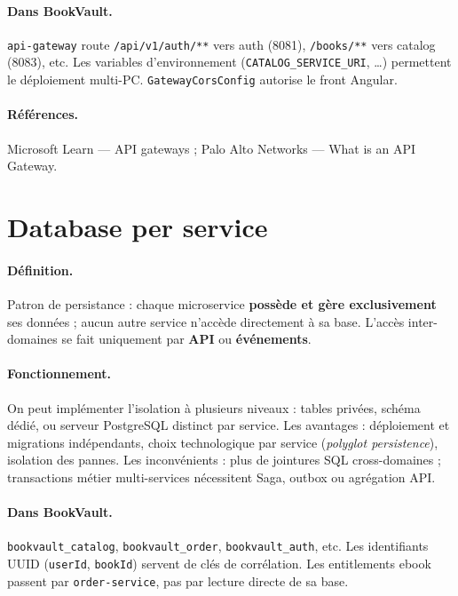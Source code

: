\documentclass[12pt,a4paper]{report}
\begin{document}
\paragraph{Dans BookVault.} \texttt{api-gateway} route \texttt{/api/v1/auth/**} vers auth (8081), \texttt{/books/**} vers catalog (8083), etc. Les variables d'environnement (\texttt{CATALOG\_SERVICE\_URI}, \ldots) permettent le déploiement multi-PC. \texttt{GatewayCorsConfig} autorise le front Angular.\par

\paragraph{Références.} Microsoft Learn — API gateways ; Palo Alto Networks — What is an API Gateway.\par


\section{Database per service}

\paragraph{Définition.} Patron de persistance : chaque microservice \textbf{possède et gère exclusivement} ses données ; aucun autre service n'accède directement à sa base. L'accès inter-domaines se fait uniquement par \textbf{API} ou \textbf{événements}.\par

\paragraph{Fonctionnement.} On peut implémenter l'isolation à plusieurs niveaux : tables privées, schéma dédié, ou serveur PostgreSQL distinct par service. Les avantages : déploiement et migrations indépendants, choix technologique par service (\textit{polyglot persistence}), isolation des pannes. Les inconvénients : plus de jointures SQL cross-domaines ; transactions métier multi-services nécessitent Saga, outbox ou agrégation API.\par

\paragraph{Dans BookVault.} \texttt{bookvault\_catalog}, \texttt{bookvault\_order}, \texttt{bookvault\_auth}, etc. Les identifiants UUID (\texttt{userId}, \texttt{bookId}) servent de clés de corrélation. Les entitlements ebook passent par \texttt{order-service}, pas par lecture directe de sa base.\par
\end{document}
